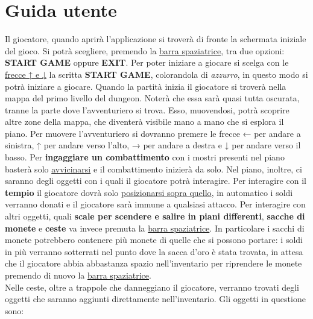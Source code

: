 \documentclass{report}
\begin{document}
\appendix
\chapter{Guida utente}

Il giocatore, quando aprirà l’applicazione si troverà di fronte la schermata iniziale del gioco. 
%
Si potrà scegliere, premendo la \underline{barra spaziatrice}, tra due opzioni: \textbf{START GAME} oppure \textbf{EXIT}.
%
Per poter iniziare a giocare si scelga con le \underline{frecce ↑ e ↓}  la scritta \textbf{START GAME}, colorandola di \textit{azzurro}, in questo modo si potrà iniziare a giocare.
%
Quando la partità inizia il giocatore si troverà nella mappa del primo livello del dungeon.
%
Noterà che essa sarà quasi tutta oscurata, tranne la parte dove l’avventuriero si trova. 
%
Esso, muovendosi, potrà scoprire altre zone della mappa, che diventerà visibile mano a mano che si esplora il piano.
%
Per muovere l’avventuriero si dovranno premere le frecce ← per andare a sinistra, ↑ per andare verso l’alto, → per andare a destra e ↓ per andare verso il basso.
%
Per \textbf{ingaggiare un combattimento} con i mostri presenti nel piano basterà solo \underline{avvicinarsi} e il combattimento inizierà da solo.
%
Nel piano, inoltre, ci saranno degli oggetti con i quali il giocatore potrà interagire.
%
Per interagire con il \textbf{tempio} il giocatore dovrà solo \underline{posizionarsi sopra quello}, in automatico i soldi verranno donati e il giocatore sarà immune a qualsiasi attacco.
%
Per interagire con altri oggetti, quali \textbf{scale per scendere e salire in piani differenti}, \textbf{sacche di monete} e \textbf{ceste} va invece premuta la \underline{barra spaziatrice}.
%
In particolare i sacchi di monete potrebbero contenere più monete di quelle che si possono portare: i soldi in più verranno sotterrati nel punto dove la sacca d’oro è stata trovata, in attesa che il giocatore abbia abbastanza spazio nell’inventario per riprendere le monete premendo di nuovo la \underline{barra spaziatrice}. 
%
\\
%
Nelle ceste, oltre a trappole che danneggiano il giocatore, verranno trovati degli oggetti che saranno aggiunti direttamente nell’inventario.
%
Gli oggetti in questione sono:
%
\end{document}
